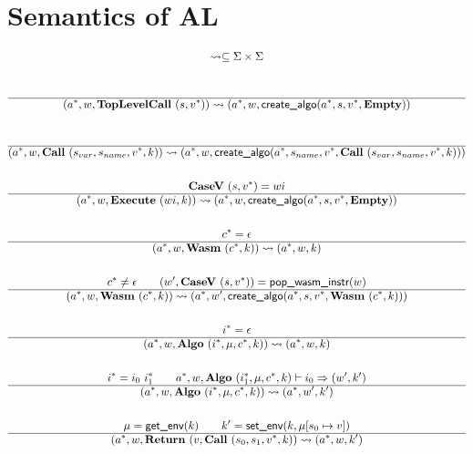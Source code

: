 \section{Semantics of AL}
\label{semantics}


\begin{gather*}
\leadsto \subseteq \Sigma \times \Sigma \\
%
\newline \\
  \\
  \hline
  (\seq{a}, w, \toplevelcall ~ (s, \seq v)) \leadsto (\seq{a}, w, \createalgo(\seq a, s, \seq v, \mt)) \\
%
\newline \\
  \\
  \hline
  (\seq{a}, w, \call ~ (s_{var}, s_{name}, \seq v, k)) \leadsto
  (\seq{a}, w, \createalgo(\seq a, s_{name}, \seq v, \call ~ (s_{var}, s_{name}, \seq v, k))) \\
%
\newline \\
  \casev ~ (s, \seq v) = wi \\
  \hline
  (\seq{a}, w, \exe ~ (wi, k)) \leadsto (\seq{a}, w, \createalgo(\seq a, s, \seq v, \mt)) \\
%
\newline \\
  \seq c = \epsilon \\
  \hline
  (\seq{a}, w, \wasm ~ (\seq c, k)) \leadsto (\seq{a}, w, k) \\
%
\newline \\
  \seq c \not= \epsilon \qquad
  (w', \casev ~ (s, \seq v)) = \popwasminstr(w) \\
  \hline
  (\seq{a}, w, \wasm ~ (\seq c, k))
  \leadsto
  (\seq{a}, w', \createalgo(\seq a, s, \seq v, \wasm ~ (\seq c, k))) \\
%
\newline \\
  \seq i = \epsilon \\
  \hline
  (\seq{a}, w, \algo ~ (\seq i, \mu, \seq c, k)) \leadsto (\seq{a}, w, k) \\
%
\newline \\
  \seq i = i_0 ~ \seq{i_1} \qquad \seq{a}, w, \algo ~ (\seq{i_1}, \mu, \seq c, k) \vdash i_0 \Rightarrow (w', k') \\
  \hline
  (\seq{a}, w, \algo ~ (\seq i, \mu, \seq c, k)) \leadsto (\seq{a}, w', k') \\
%
\newline \\
  \mu = \getenv(k) \qquad k' = \setenv(k, \mu[s_0 \mapsto v]) \\
  \hline
  (\seq{a}, w, \ret ~ (v, \call ~ (s_0, s_1, \seq v, k)) \leadsto (\seq a, w, k') \\
\end{gather*}

